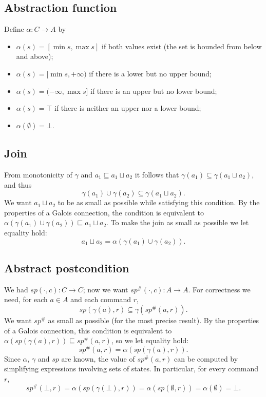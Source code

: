\subsection*{Abstraction function}
 
Define $\alpha : C \to A$ by
\begin{itemize}
  \item $\alpha(s) = [\min s, \max s]$ if both values exist (the set is bounded from below and above);
  \item $\alpha(s) = [\min s, +\infty)$ if there is a lower but no upper bound;
  \item $\alpha(s) = (-\infty, \max s]$ if there is an upper but no lower bound;
  \item $\alpha(s) = \top$ if there is neither an upper nor a lower bound;
  \item $\alpha(\emptyset) = \bot$.
\end{itemize}
 
 
\subsection*{Join}
 
From monotonicity of $\gamma$ and $a_1 \sqsubseteq a_1 \sqcup a_2$ it follows that $\gamma(a_1) \subseteq \gamma(a_1 \sqcup a_2)$, and thus
\[
\gamma(a_1) \cup \gamma(a_2) \subseteq \gamma(a_1 \sqcup a_2).
\]
We want $a_1 \sqcup a_2$ to be as small as possible while satisfying this condition. By the properties of a Galois connection, the condition is equivalent to $\alpha(\gamma(a_1) \cup \gamma(a_2)) \sqsubseteq a_1 \sqcup a_2$. To make the join as small as possible we let equality hold:
\[
a_1 \sqcup a_2 = \alpha(\gamma(a_1) \cup \gamma(a_2)).
\]
 
\subsection*{Abstract postcondition}
 
We had $sp(\cdot, c) : C \to C$; now we want $sp^\#(\cdot, c) : A \to A$. For correctness we need, for each $a \in A$ and each command $r$,
\[
sp(\gamma(a), r) \subseteq \gamma(sp^\#(a, r)).
\]
We want $sp^\#$ as small as possible (for the most precise result). By the properties of a Galois connection, this condition is equivalent to $\alpha(sp(\gamma(a), r)) \sqsubseteq sp^\#(a, r)$, so we let equality hold:
\[
sp^\#(a, r) = \alpha(sp(\gamma(a), r)).
\]
Since $\alpha$, $\gamma$ and $sp$ are known, the value of $sp^\#(a, r)$ can be computed by simplifying expressions involving sets of states. In particular, for every command $r$,
\[
sp^\#(\bot, r) = \alpha(sp(\gamma(\bot), r)) = \alpha(sp(\emptyset, r)) = \alpha(\emptyset) = \bot.
\]
 
